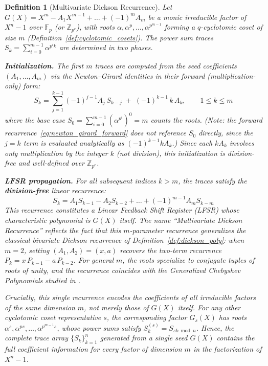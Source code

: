 \documentclass[12pt]{article}
\theoremstyle{plain}
\newtheorem{defn}{Definition}
\begin{document}
\begin{defn}[Multivariate Dickson Recurrence] \cite{Macdonald1995} \label{def:dickson_multi}
Let $G(X) = X^m - A_1 X^{m-1} + \dots + (-1)^m A_m$ be a monic irreducible factor of $X^n-1$ over $\mathbb{F}_p$ (or $\mathbb{Z}_{p^e}$), with roots $\alpha, \alpha^p, \dots, \alpha^{p^{m-1}}$ forming a $q$-cyclotomic coset of size $m$ (Definition~\ref{def:cyclotomic_cosets}). The power sum traces $S_k = \sum_{i=0}^{m-1} \alpha^{p^i k}$ are determined in two phases.

\textbf{Initialization.} The first $m$ traces are computed from the seed coefficients $(A_1, \dots, A_m)$ via the Newton--Girard identities in their forward (multiplication-only) form:
\begin{equation} \label{eq:newton_girard_forward}
    S_k = \sum_{j=1}^{k-1} (-1)^{j-1} A_j\, S_{k-j} \;+\; (-1)^{k-1}\, k\, A_k, \qquad 1 \leq k \leq m
\end{equation}
where the base case $S_0 = \sum_{i=0}^{m-1} (\alpha^{p^i})^0 = m$ counts the roots. (Note: the forward recurrence~\eqref{eq:newton_girard_forward} does not reference $S_0$ directly, since the $j=k$ term is evaluated analytically as $(-1)^{k-1} k A_k$.) Since each $k A_k$ involves only multiplication by the integer $k$ (not division), this initialization is division-free and well-defined over $\mathbb{Z}_{p^e}$.

\textbf{LFSR propagation.} For all subsequent indices $k > m$, the traces satisfy the \textbf{division-free} linear recurrence:
\begin{equation} \label{eq:dickson_forward}
    S_k = A_1 S_{k-1} - A_2 S_{k-2} + \dots + (-1)^{m-1} A_m S_{k-m}
\end{equation}
This recurrence constitutes a Linear Feedback Shift Register (LFSR) whose characteristic polynomial is $G(X)$ itself. The name ``Multivariate Dickson Recurrence'' reflects the fact that this $m$-parameter recurrence generalizes the classical bivariate Dickson recurrence of Definition~\ref{def:dickson_poly}: when $m = 2$, setting $(A_1, A_2) = (x, a)$ recovers the two-term recurrence $P_k = x\, P_{k-1} - a\, P_{k-2}$. For general $m$, the roots specialize to conjugate tuples of roots of unity, and the recurrence coincides with the Generalized Chebyshev Polynomials studied in \cite{Chou1997, Fitzgerald2005}.

Crucially, this single recurrence encodes the coefficients of \emph{all} irreducible factors of the same dimension $m$, not merely those of $G(X)$ itself. For any other cyclotomic coset representative $s$, the corresponding factor $G_s(X)$ has roots $\alpha^s, \alpha^{ps}, \dots, \alpha^{p^{m-1}s}$, whose power sums satisfy $S_k^{(s)} = S_{sk \bmod n}$. Hence, the complete trace array $\{S_k\}_{k=1}^{n}$ generated from a single seed $G(X)$ contains the full coefficient information for every factor of dimension $m$ in the factorization of $X^n-1$.
\end{defn}
\end{document}
